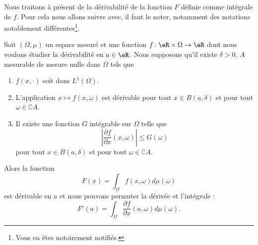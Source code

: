 Nous traitons à présent de la dérivabilité de la fonction \( F\) définie comme intégrale de \( f\). Pour cela nous allons suivre \cite{MesIntProbb} avec, il faut le noter, notamment des notations notablement différentes\footnote{Vous en êtes notoirement notifiés.}.

\begin{theorem}    \label{ThoMWpRKYp}
    Soit \( (\Omega,\mu)\) un espace mesuré et une fonction \( f\colon \eR\times \Omega\to \eR\) dont nous voulons étudier la dérivabilité en \(a\in \eR\). Nous supposons qu'il existe \( \delta>0\), \( A\) mesurable de mesure nulle dans \( \Omega\) tels que
    \begin{enumerate}
        \item
            \( f(x,\cdot)\) soit dans \( L^1(\Omega)\).
        \item
            L'application \( x\mapsto f(x,\omega)\) est dérivable pour tout \( x\in B(a,\delta)\) et pour tout \( \omega\in \complement A\).
        \item
            Il existe une fonction \( G\) intégrable sur \( \Omega\) telle que
            \begin{equation}
                \left| \frac{ \partial f }{ \partial x }(x,\omega) \right| \leq G(\omega)
            \end{equation}
            pour tout \( x\in B(a,\delta)\) et pour tout \( \omega\in\complement A\).
    \end{enumerate}
    Alors la fonction
    \begin{equation}
        F(x)=\int_{\Omega}f(x,\omega)d\mu(\omega)
    \end{equation}
    est dérivable en \( a\) et nous pouvons permuter la dérivée et l'intégrale :
    \begin{equation}
        F'(a)=\int_{\Omega}\frac{ \partial f }{ \partial x }(a,\omega)d\mu(\omega).
    \end{equation}
\end{theorem}

